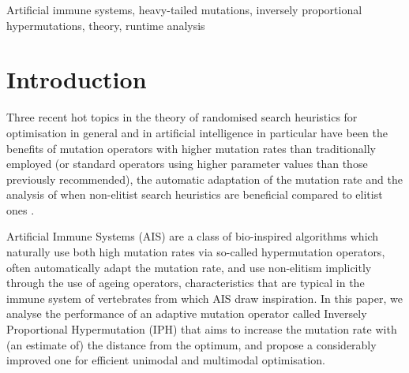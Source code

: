 \documentclass[lettersize,journal]{IEEEtran}
\begin{document}
\begin{IEEEkeywords}
Artificial immune systems, heavy-tailed mutations, inversely proportional hypermutations, theory, runtime analysis
\end{IEEEkeywords}

\section{Introduction}
Three recent hot topics in the theory of randomised search heuristics for optimisation in general and in artificial intelligence in particular have been the benefits of mutation operators with higher mutation rates than traditionally employed\cite{FQWGECCO18,FGQWPPSN18,CorusOlivetoYazdani2021TEVC,DoerrGECCO2017FastGA} (or standard operators using higher parameter values than those previously recommended\cite{CorusOlivetoTEVCsteadyGA2017,JumpTEVC2017,CorusOlivetoGecco2019,OlivetoSudholtWitt2020,DoerrDoerrEbel2015,LenglerTEVC2019}), the automatic adaptation of the mutation rate \cite{DoerrDoerrBookChapter,DLOW2018,DoerrEtAl2016B,LissovoiEtAl2020ECJ,LOWAAAI2020,DOW2026} and the analysis of when non-elitist search heuristics are beneficial compared to elitist ones \cite{OlivetoPaizJorgeSudholt2017Algorithmica,LOW2023,Lehr2021AAAI,DoerrComma2020,CaseLehreTEVC,DangJansenLehreGECCO2015,DangLehreFOGA2015,LenglerSchillerSieberling2024,HeviaSudholtAlgo24}. 

Artificial Immune Systems (AIS) are a class of bio-inspired algorithms which naturally use both high mutation rates via so-called hypermutation operators, often automatically adapt the mutation rate,  and use non-elitism implicitly through the use of ageing operators, characteristics that are typical in the immune system of vertebrates from which AIS draw inspiration. In this paper, we analyse the performance of an adaptive mutation operator called Inversely Proportional Hypermutation (IPH) that aims to increase the mutation rate with (an estimate of) the distance from the optimum, and propose a considerably improved one for efficient unimodal and multimodal optimisation.
\end{document}
